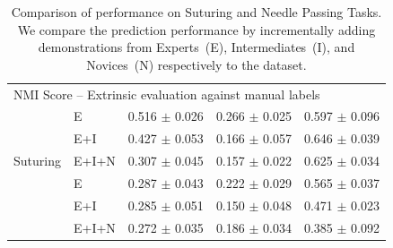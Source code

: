 \documentclass[0-main.tex]{subfiles}
\begin{document}
\begin{table}[t!]
{\begin{tabular}{ll|l|l|l}
        \multicolumn{5}{l}{\cellcolor[HTML]{FFC72C} NMI Score -- Extrinsic evaluation against manual labels} \\ 
        \cellcolor[HTML]{CBCEFB}                                 & E     &0.516 $\pm$ 0.026 &	0.266 $\pm$ 0.025 & 	0.597 $\pm$ 0.096\\
        \rowcolor[HTML]{E0E0E0}
        \cellcolor[HTML]{CBCEFB}                                 & E+I   & 0.427 $\pm$ 0.053 & 0.166 $\pm$ 0.057   & 0.646 $\pm$ 0.039 \\ 
        \multirow{-3}{*}{\cellcolor[HTML]{CBCEFB}Suturing}       & E+I+N & 0.307 $\pm$ 0.045 &  0.157 $\pm$ 0.022  & 0.625 $\pm $ 0.034  \\ 
        \rowcolor[HTML]{E0E0E0}

           \cellcolor[HTML]{FFC72C}                                 & E     & 0.287 $\pm$ 0.043& 0.222 $\pm$ 0.029& 0.565 $\pm$ 0.037 \\ 
        \cellcolor[HTML]{FFC72C}                                 & E+I   & 0.285 $\pm$ 0.051 & 0.150 $\pm$ 0.048 & 0.471 $\pm$ 0.023  \\ 
        \rowcolor[HTML]{E0E0E0}
        \multirow{-3}{*}{\cellcolor[HTML]{FFC72C}\parbox{1.2cm}{Needle Passing}} & E+I+N & 0.272 $\pm$ 0.035 &  0.186 $\pm$ 0.034  & 0.385 $\pm$ 0.092 \\ \hline
        \end{tabular}
    }
    \caption{Comparison of \TSC performance on Suturing and Needle Passing Tasks. We compare the prediction performance by incrementally adding demonstrations from Experts~(E), Intermediates~(I), and Novices~(N) respectively to the dataset.\label{tab:jigsaws}}
    \par\vspace{0pt}
    \vspace{-15pt}
\end{table}
\end{document}

